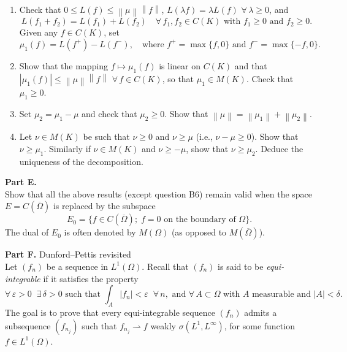 \documentclass[12pt]{article}
\newcommand{\norm}[1]{\left\|#1\right\|}
\newcommand{\abs}[1]{\left|#1\right|}
\begin{document}
\begin{enumerate}
\item Check that $0 \le L(f) \le \norm{\mu}\norm{f}$, $L(\lambda f) = \lambda L(f)$ $\forall\, \lambda \ge 0$, and
\[
L(f_1 + f_2) = L(f_1) + L(f_2) \quad \forall\, f_1, f_2 \in C(K) \text{ with } f_1 \ge 0 \text{ and } f_2 \ge 0.
\]
Given any $f \in C(K)$, set
\[
\mu_1(f) = L(f^+) - L(f^-), \quad \text{where } f^+ = \max\{f,0\} \text{ and } f^- = \max\{-f, 0\}.
\]
 
\item Show that the mapping $f \mapsto \mu_1(f)$ is linear on $C(K)$ and that
$\abs{\mu_1(f)} \le \norm{\mu}\norm{f}$ $\forall\, f \in C(K)$, so that $\mu_1 \in M(K)$. Check that $\mu_1 \ge 0$.
 
\item Set $\mu_2 = \mu_1 - \mu$ and check that $\mu_2 \ge 0$. Show that $\norm{\mu} = \norm{\mu_1} + \norm{\mu_2}$.
 
\item Let $\nu \in M(K)$ be such that $\nu \ge 0$ and $\nu \ge \mu$ (i.e., $\nu - \mu \ge 0$). Show that
$\nu \ge \mu_1$. Similarly if $\nu \in M(K)$ and $\nu \ge -\mu$, show that $\nu \ge \mu_2$.
Deduce the uniqueness of the decomposition.
\end{enumerate}
 
\noindent\textbf{Part E.}\\
Show that all the above results (except question B6) remain valid when the space
$E = C(\overline{\Omega})$ is replaced by the subspace
\[
E_0 = \{f \in C(\overline{\Omega});\; f = 0 \text{ on the boundary of } \Omega\}.
\]
The dual of $E_0$ is often denoted by $M(\Omega)$ (as opposed to $M(\overline{\Omega})$).
 
\medskip
 
\noindent\textbf{Part F.} Dunford--Pettis revisited\\
Let $(f_n)$ be a sequence in $L^1(\Omega)$. Recall that $(f_n)$ is said to be \emph{equi-integrable} if
it satisfies the property
\begin{equation}\tag{4}
\forall\, \varepsilon > 0\;\; \exists\, \delta > 0 \text{ such that } \int_A \abs{f_n} < \varepsilon\;\; \forall\, n,
\text{ and } \forall\, A \subset \Omega \text{ with } A \text{ measurable and } \abs{A} < \delta.
\end{equation}
The goal is to prove that every equi-integrable sequence $(f_n)$ admits a subsequence
$(f_{n_j})$ such that $f_{n_j} \rightharpoonup f$ weakly $\sigma(L^1, L^\infty)$, for some function $f \in L^1(\Omega)$.
 
\end{document}
